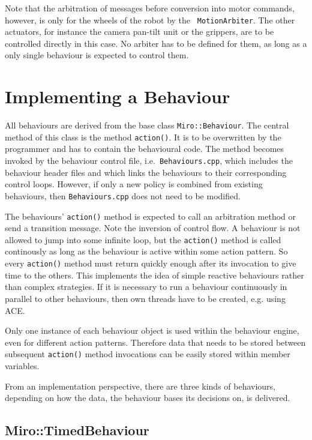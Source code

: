 Note that the arbitration of messages before conversion into motor
commands, however, is only for the wheels of the robot by the {\tt
  MotionArbiter}.  The other actuators, for instance the camera
pan-tilt unit or the grippers, are to be controlled directly in this
case. No arbiter has to be defined for them, as long as a only single
behaviour is expected to control them.

\section{Implementing a Behaviour}

All behaviours are derived from the base class {\tt Miro::Behaviour}.
The central method of this class is the method {\tt action()}.
It is to be overwritten by the programmer
and has to contain the behavioural code.
The method becomes invoked by the behaviour control file,
i.e.\ {\tt Behaviours.cpp}, which includes the behaviour header files
and which links the behaviours to their corresponding control loops.
However, if only a new policy is combined from existing behaviours,
then {\tt Behaviours.cpp} does not need to be modified.

The behaviours' {\tt action()} method is expected to call an arbitration
method or send a transition message. Note the inversion of control flow.
A behaviour is not allowed to jump into some infinite loop,
but the {\tt action()} method is called continously
as long as the behaviour is active within some action pattern.
So every {\tt action()} method must return quickly enough after its
invocation to give time to the others. This implements the idea of
simple reactive behaviours rather than complex strategies.
If it is necessary to run a behaviour continuously in parallel to other
behaviours, then own threads have to be created, e.g. using ACE.

Only one instance of each behaviour object is used within the behaviour
engine, even for different action patterns.  Therefore data that needs
to be stored between subsequent {\tt action()} method invocations can
be easily stored within member variables.

From an implementation perspective, there are three kinds of
behaviours, depending on how the data, the behaviour bases its
decisions on, is delivered.

\subsection{Miro::TimedBehaviour}
\label{SEC:MIRO_TIMED_BEHAVIOUR}

